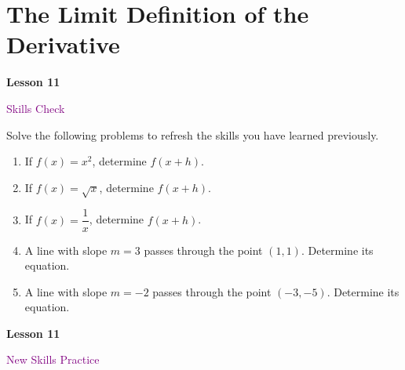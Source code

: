 \documentclass[10pt]{book}
\theoremstyle{definition}
\theoremstyle{remark}
\begin{document}
\section{The Limit Definition of the Derivative}
\begin{tcolorbox}[
  width=\textwidth,
  colback=gray!10, %
  colframe=white, %
  boxrule=0pt,    %
  left=1cm,       %
  right=1cm,      %
  sharp corners  %
]

\begin{minipage}[t]{0.5\textwidth}
  \Huge \textbf{Lesson 11}
\end{minipage}%
\hfill
\begin{minipage}[t]{0.5\textwidth}
  \Huge \textcolor{purple}{Skills Check}
\end{minipage}
\end{tcolorbox}

\begin{large}
\noindent
Solve the following problems to refresh the skills you have learned previously.
\begin{enumerate}
\item If $f(x)=x^{2}$, determine $f(x+h)$.\vfil \vfil \vfil
\item If $f(x)=\sqrt{x}$, determine $f(x+h)$.\vfil \vfil \vfil
\item If $f(x)=\dfrac{1}{x}$, determine $f(x+h)$.\vfil \vfil\vfil
\item A line with slope $m=3$ passes through the point $(1,1)$. Determine its equation.\vfil \vfil \vfil
\item A line with slope $m=-2$ passes through the point $(-3,-5)$. Determine its equation.\vfil \vfil \vfil
\end{enumerate}
\end{large}
\newpage


\begin{tcolorbox}[
  width=\textwidth,
  colback=gray!10, %
  colframe=white, %
  boxrule=0pt,    %
  left=1cm,       %
  right=1cm,      %
  sharp corners  %
]

\begin{minipage}[t]{0.5\textwidth}
  \Huge \textbf{Lesson 11}
\end{minipage}%
\hfill
\begin{minipage}[t]{0.5\textwidth}
  \Huge\textcolor{purple}{New Skills Practice}
\end{minipage}
\end{tcolorbox}
\end{document}
